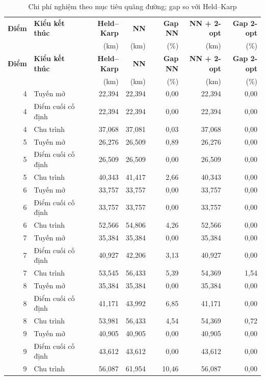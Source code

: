 \small
\setlength{\tabcolsep}{4pt}
\begin{longtable}{r l r r r r r}
\caption{Chi phí nghiệm theo mục tiêu quãng đường; gap so với Held--Karp}
\label{tab:tsp-quality}\\
\toprule
\textbf{Điểm} & \textbf{Kiểu kết thúc} & \textbf{Held--Karp} & \textbf{NN} &
\textbf{Gap NN} & \textbf{NN + 2-opt} & \textbf{Gap 2-opt} \\
 & & (km) & (km) & (\%) & (km) & (\%) \\
\midrule
\endfirsthead
\toprule
\textbf{Điểm} & \textbf{Kiểu kết thúc} & \textbf{Held--Karp} & \textbf{NN} &
\textbf{Gap NN} & \textbf{NN + 2-opt} & \textbf{Gap 2-opt} \\
 & & (km) & (km) & (\%) & (km) & (\%) \\
\midrule
\endhead
4 & Tuyến mở & 22,394 & 22,394 & 0,00 & 22,394 & 0,00 \\
4 & Điểm cuối cố định & 22,394 & 22,394 & 0,00 & 22,394 & 0,00 \\
4 & Chu trình & 37,068 & 37,081 & 0,03 & 37,068 & 0,00 \\
5 & Tuyến mở & 26,276 & 26,509 & 0,89 & 26,276 & 0,00 \\
5 & Điểm cuối cố định & 26,509 & 26,509 & 0,00 & 26,509 & 0,00 \\
5 & Chu trình & 40,343 & 41,417 & 2,66 & 40,343 & 0,00 \\
6 & Tuyến mở & 33,757 & 33,757 & 0,00 & 33,757 & 0,00 \\
6 & Điểm cuối cố định & 33,757 & 33,757 & 0,00 & 33,757 & 0,00 \\
6 & Chu trình & 52,566 & 54,806 & 4,26 & 52,566 & 0,00 \\
7 & Tuyến mở & 35,384 & 35,384 & 0,00 & 35,384 & 0,00 \\
7 & Điểm cuối cố định & 40,927 & 42,206 & 3,13 & 40,927 & 0,00 \\
7 & Chu trình & 53,545 & 56,433 & 5,39 & 54,369 & 1,54 \\
8 & Tuyến mở & 35,384 & 35,384 & 0,00 & 35,384 & 0,00 \\
8 & Điểm cuối cố định & 41,171 & 43,992 & 6,85 & 41,171 & 0,00 \\
8 & Chu trình & 53,981 & 56,433 & 4,54 & 54,369 & 0,72 \\
9 & Tuyến mở & 40,905 & 40,905 & 0,00 & 40,905 & 0,00 \\
9 & Điểm cuối cố định & 43,612 & 43,612 & 0,00 & 43,612 & 0,00 \\
9 & Chu trình & 56,087 & 61,954 & 10,46 & 56,087 & 0,00 \\

\end{longtable}
